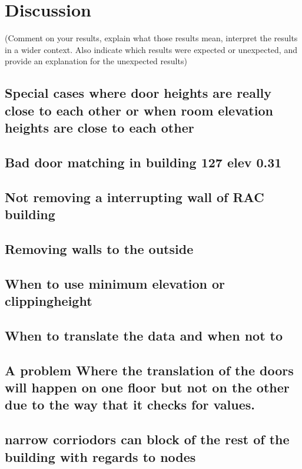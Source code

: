 




\section{Discussion}
(Comment on your results, explain what those results mean, interpret the results in a wider context. Also indicate which results were expected or unexpected, and provide an explanation for the unexpected results)

\subsection{Special cases where door heights are really close to each other or when room elevation heights are close to each other}

\subsection{Bad door matching in building 127 elev 0.31}

\subsection{Not removing a interrupting wall of RAC building}

\subsection{Removing walls to the outside}

\subsection{When to use minimum elevation or clippingheight}


\subsection{When to translate the data and when not to}

\subsection{A problem Where the translation of the doors will happen on one floor but not on the other due to the way that it checks for values.}

\subsection{narrow corriodors can block of the rest of the building with regards to nodes}

